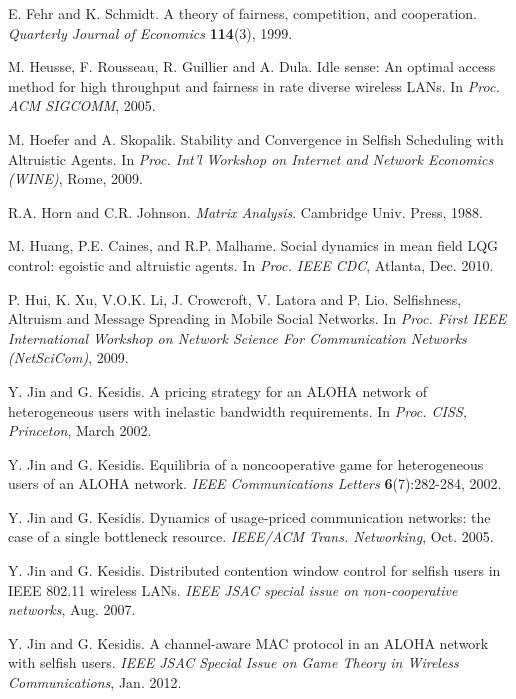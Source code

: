 \documentclass[12pt,onecolumn,draftcls]{IEEEtran}
\begin{document}
\begin{thebibliography}{9}
E. Fehr and K. Schmidt.
A theory of fairness, competition, and cooperation.
{\em Quarterly Journal of Economics}
{\bf 114}(3), 1999.





M. Heusse, F. Rousseau, R. Guillier and A. Dula.
Idle sense: An optimal access method for high throughput and fairness in
rate diverse wireless LANs.
In {\em Proc. ACM SIGCOMM}, 2005.

 M. Hoefer and A. Skopalik.
 Stability and Convergence in Selfish Scheduling with Altruistic Agents. In
{\em Proc. Int'l Workshop on Internet and Network Economics (WINE)},
Rome, 2009.

R.A. Horn and C.R. Johnson.
{\em Matrix Analysis}.  Cambridge Univ. Press, 1988.

M. Huang, P.E. Caines, and R.P. Malhame. Social dynamics in mean 
field LQG control: egoistic and altruistic agents. 
In {\em Proc. IEEE CDC}, Atlanta, Dec. 2010.

P. Hui, K. Xu, V.O.K. Li, J. Crowcroft, V. Latora and P. Lio.
Selfishness, Altruism and Message Spreading in Mobile Social Networks.
In {\em
Proc. First IEEE International Workshop on Network Science 
For Communication Networks (NetSciCom)},
2009.


Y. Jin and G. Kesidis.
A pricing strategy for an {ALOHA} network of heterogeneous users with inelastic bandwidth requirements.
In {\em Proc. CISS, Princeton}, March 2002.

Y. Jin and G. Kesidis.
Equilibria of a noncooperative game for heterogeneous users of an {ALOHA} network.
{\em IEEE Communications Letters} {\bf  6}(7):282-284, 2002.
	


Y. Jin and G. Kesidis.
Dynamics of usage-priced communication networks:
the case of a single bottleneck resource.
        {\em IEEE/ACM Trans. Networking},
        Oct. 2005.



Y. Jin and G. Kesidis. Distributed contention window control
for selfish users in IEEE 802.11 wireless LANs. {\em IEEE JSAC
special issue on non-cooperative networks}, Aug. 2007.

Y. Jin and G. Kesidis.
A channel-aware MAC protocol in an ALOHA
network with selfish users.
{\em IEEE JSAC Special Issue on Game Theory in Wireless Communications},
Jan. 2012.


\end{thebibliography}
\end{document}
